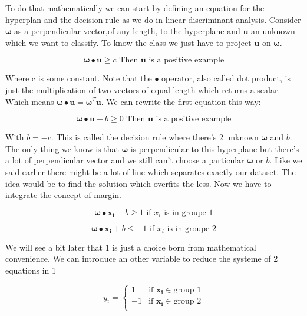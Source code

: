 \documentclass[a4paper,11pt]{article}
\numberwithin{equation}{section}
\begin{document}
To do that mathematically we can start by defining an equation for the hyperplan and the decision rule as we do in linear discriminant analysis. Consider $\boldsymbol{\omega}$ as a perpendicular vector,of any length, to the hyperplane and $\boldsymbol{u}$ an unknown which we want to classify. To know the class we just have to project  $\boldsymbol{u}$ on $\boldsymbol{\omega}$. 


\begin{equation*}
\boldsymbol{\omega}\bullet{\boldsymbol{u}} \geq c \mbox{ Then } \boldsymbol{u} \mbox{ is a positive example}
\end{equation*}

Where c is some constant. Note that the $\bullet$ operator, also called dot product, is just the multiplication of two vectors of equal length which returns a scalar. Which means $\boldsymbol{\omega}\bullet{\boldsymbol{u}} = \boldsymbol{\omega}^T{\boldsymbol{u}}$. We can rewrite the first equation this way:

\begin{equation}\label{eq:1}
\boldsymbol{\omega}\bullet{\boldsymbol{u}} + b \geq 0 \mbox{ Then } \boldsymbol{u} \mbox{ is a positive example}
\end{equation}

With $b = -c$. This is called the decision rule where there's 2 unknown $\boldsymbol{\omega}$ and $b$. The only thing we know is that $\boldsymbol{\omega}$ is perpendicular to this hyperplane but there's a lot of perpendicular vector and we still can't choose a particular $\boldsymbol{\omega}$ or $b$. Like we said earlier there might be a lot of line which separates exactly our dataset. The idea would be to find the solution which overfits the less. Now we have to integrate the concept of margin.

\begin{equation}\label{eq:2}
\boldsymbol{\omega}\bullet{\boldsymbol{x_i}} + b \geq 1 \mbox{ if } x_i \mbox{ is in groupe 1}
\end{equation}

\begin{equation}\label{eq:3}
\boldsymbol{\omega}\bullet{\boldsymbol{x_i}} + b \leq -1\mbox{ if } x_i \mbox{ is in groupe 2}
\end{equation}

We will see a bit later that 1 is just a choice born from mathematical convenience. We can introduce an other variable to reduce the systeme of 2 equations in 1

\begin{equation}\label{eq:4}
    y_i = \begin{cases}
               1               & \mbox{if }\boldsymbol{x_i} \in \mbox{group 1}\\
               -1               & \mbox{if }\boldsymbol{x_i} \in \mbox{group 2} \\
           \end{cases}
\end{equation}
\end{document}
